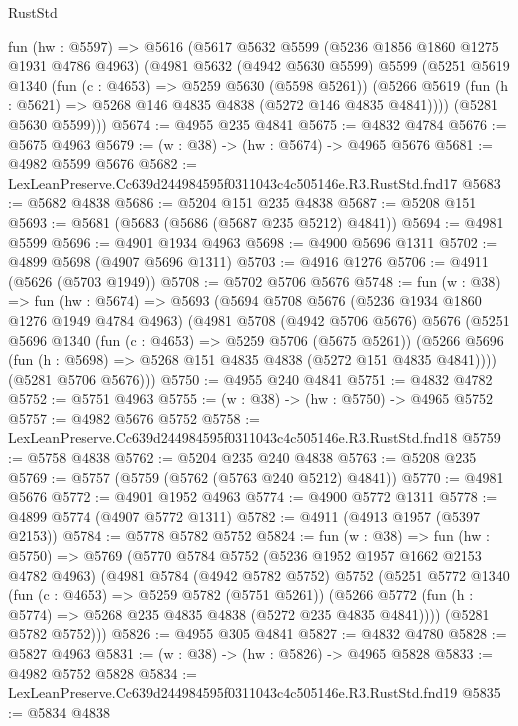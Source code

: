 \begin{lexlean}{RustStd}
\begin{coremodule}
  fun (hw : @5597) =>
  @5616
    (@5617
      @5632
      @5599
      (@5236 @1856 @1860 @1275 @1931 @4786 @4963)
      (@4981
        @5632
        (@4942 @5630 @5599)
        @5599
        (@5251
          @5619
          @1340
          (fun (c : @4653) => @5259 @5630 (@5598 @5261))
          (@5266 @5619 (fun (h : @5621) => @5268 @146 @4835 @4838 (@5272 @146 @4835 @4841))))
        (@5281 @5630 @5599)))
@5674 := @4955 @235 @4841
@5675 := @4832 @4784
@5676 := @5675 @4963
@5679 := (w : @38) -> (hw : @5674) -> @4965 @5676
@5681 := @4982 @5599 @5676
@5682 := LexLeanPreserve.Cc639d244984595f0311043c4c505146e.R3.RustStd.fnd17
@5683 := @5682 @4838
@5686 := @5204 @151 @235 @4838
@5687 := @5208 @151
@5693 := @5681 (@5683 (@5686 (@5687 @235 @5212) @4841))
@5694 := @4981 @5599
@5696 := @4901 @1934 @4963
@5698 := @4900 @5696 @1311
@5702 := @4899 @5698 (@4907 @5696 @1311)
@5703 := @4916 @1276
@5706 := @4911 (@5626 (@5703 @1949))
@5708 := @5702 @5706 @5676
@5748 := fun (w : @38) =>
  fun (hw : @5674) =>
  @5693
    (@5694
      @5708
      @5676
      (@5236 @1934 @1860 @1276 @1949 @4784 @4963)
      (@4981
        @5708
        (@4942 @5706 @5676)
        @5676
        (@5251
          @5696
          @1340
          (fun (c : @4653) => @5259 @5706 (@5675 @5261))
          (@5266 @5696 (fun (h : @5698) => @5268 @151 @4835 @4838 (@5272 @151 @4835 @4841))))
        (@5281 @5706 @5676)))
@5750 := @4955 @240 @4841
@5751 := @4832 @4782
@5752 := @5751 @4963
@5755 := (w : @38) -> (hw : @5750) -> @4965 @5752
@5757 := @4982 @5676 @5752
@5758 := LexLeanPreserve.Cc639d244984595f0311043c4c505146e.R3.RustStd.fnd18
@5759 := @5758 @4838
@5762 := @5204 @235 @240 @4838
@5763 := @5208 @235
@5769 := @5757 (@5759 (@5762 (@5763 @240 @5212) @4841))
@5770 := @4981 @5676
@5772 := @4901 @1952 @4963
@5774 := @4900 @5772 @1311
@5778 := @4899 @5774 (@4907 @5772 @1311)
@5782 := @4911 (@4913 @1957 (@5397 @2153))
@5784 := @5778 @5782 @5752
@5824 := fun (w : @38) =>
  fun (hw : @5750) =>
  @5769
    (@5770
      @5784
      @5752
      (@5236 @1952 @1957 @1662 @2153 @4782 @4963)
      (@4981
        @5784
        (@4942 @5782 @5752)
        @5752
        (@5251
          @5772
          @1340
          (fun (c : @4653) => @5259 @5782 (@5751 @5261))
          (@5266 @5772 (fun (h : @5774) => @5268 @235 @4835 @4838 (@5272 @235 @4835 @4841))))
        (@5281 @5782 @5752)))
@5826 := @4955 @305 @4841
@5827 := @4832 @4780
@5828 := @5827 @4963
@5831 := (w : @38) -> (hw : @5826) -> @4965 @5828
@5833 := @4982 @5752 @5828
@5834 := LexLeanPreserve.Cc639d244984595f0311043c4c505146e.R3.RustStd.fnd19
@5835 := @5834 @4838

\end{coremodule}
\end{lexlean}
